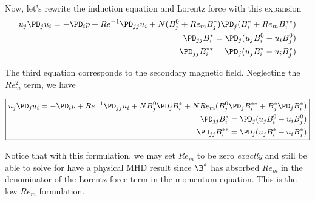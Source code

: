 \documentclass[11pt]{article}
\begin{document}
Now, let's rewrite the induction equation and Lorentz force with this expansion
\begin{equation}\begin{aligned}
u_j\PD_j u_i =-\PD_i p+ Re^{-1} \PD_{jj} u_i + N (B_j^0+Re_m B_j^*) \PD_j (B_i^* + Re_m B_i^{**}) \\
\PD_{jj} B_i^{*}  = \PD_j (u_j B_i^{0} - u_i B_j^{0}) \\
\PD_{jj} B_i^{**} = \PD_j (u_j B_i^{*} - u_i B_j^{*}) \\
\end{aligned} \end{equation}

The third equation corresponds to the secondary magnetic field. Neglecting the $Re_m^2$ term, we have

\begin{equation}\boxed{\begin{aligned}
u_j\PD_j u_i =-\PD_i p+ Re^{-1} \PD_{jj} u_i + N B_j^0 \PD_j B_i^* + N Re_m ( B_j^0 \PD_j B_i^{**} + B_j^* \PD_j B_i^* ) \\
\PD_{jj} B_i^{*}  = \PD_j (u_j B_i^{0} - u_i B_j^{0}) \\
\PD_{jj} B_i^{**} = \PD_j (u_j B_i^{*} - u_i B_j^{*}) \\
\end{aligned}}\end{equation}

Notice that with this formulation, we may set $Re_m$ to be zero \textit{exactly} and still be able to solve for have a physical MHD result since $\B^*$ has absorbed $Re_m$ in the denominator of the Lorentz force term in the momentum equation. This is the low $Re_m$ formulation.
\end{document}
